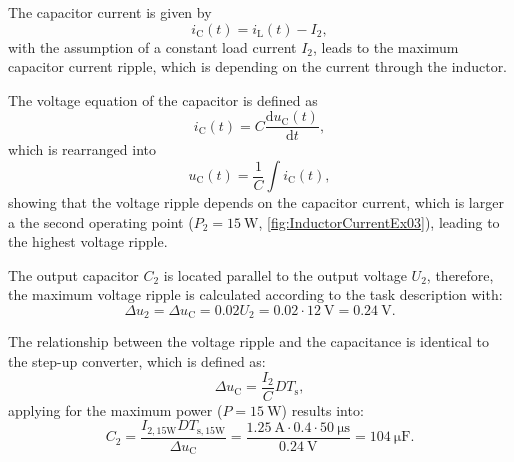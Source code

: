 \begin{solutionblock}
    The capacitor current is given by
    \begin{equation}
        i_{\mathrm{C}}(t) = i_{\mathrm{L}}(t)-I_{\mathrm{2}},
    \end{equation}
    with the assumption of a constant load current $I_2$, leads to the maximum capacitor current ripple, which is depending on the current through the inductor.

    The voltage equation of the capacitor is defined as
    \begin{equation}
        i_{\mathrm{C}}(t) = C\frac{\mathrm{d}u_{\mathrm{C}}(t)}{\mathrm{d}t},
    \end{equation}
    which is rearranged into
    \begin{equation}
        u_{\mathrm{C}}(t) = \frac{1}{C} \int i_{\mathrm{C}}(t),
    \end{equation}
    showing that the voltage ripple depends on the capacitor current, which is larger a the second operating point ($P_2 = \SI{15}{\watt}$, \autoref{fig:InductorCurrentEx03}), leading to the highest voltage ripple.
\end{solutionblock}


\begin{solutionblock}
    The output capacitor $C_2$ is located parallel to the output voltage $U_2$, therefore, the maximum voltage ripple is calculated according to the task description with:
    \begin{equation}
        \Delta u_2 = \Delta u_{\mathrm{C}} = 0.02 U_2 = 0.02 \cdot \SI{12}{\volt} = \SI{0.24}{\volt}.
    \end{equation}

    The relationship between the voltage ripple and the capacitance is identical to the step-up converter, which is defined as:
    \begin{equation}
        \Delta u_{\mathrm{C}} = \frac{I_2}{C} D T_{\mathrm{s}},
    \end{equation}
    applying for the maximum power ($P = \SI{15}{\watt}$) results into:
    \begin{equation}
        C_2 = \frac{I_{\mathrm{2,15W}} D T_{\mathrm{s,15W}}}{\Delta u_{\mathrm{C}}}
        = \frac{\SI{1.25}{\ampere} \cdot 0.4 \cdot \SI{50}{\micro\second}}{\SI{0.24}{\volt}}
        = \SI{104}{\micro\farad}. 
    \end{equation}

\end{solutionblock}

